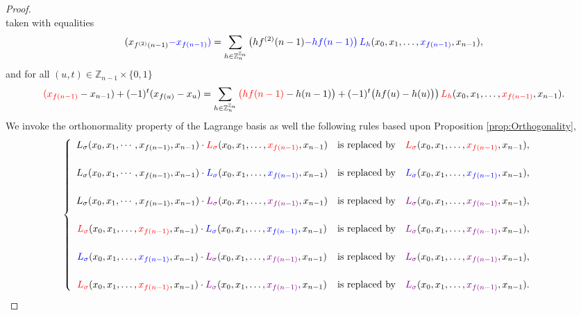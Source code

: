 \begin{proof}
\[\]
taken with equalities
\[
(x_{f^{(2)}(n-1)}{\color{blue}-x_{f(n-1)}}{\color{blue})}=\sum_{h\in\mathbb{Z}_{n}^{\mathbb{Z}_{n}}}\big(hf^{(2)}(n-1){\color{blue}-hf(n-1)}{\color{blue}\big)}\,{\color{blue}L_{h}}(x_{0},x_{1},\ldots,{\color{blue}x_{f(n-1)}},x_{n-1}),
\]
and for all $(u,t)\in\mathbb{Z}_{n-1}\times\{0,1\}$
\[
{\color{red}(x_{f(n-1)}}-x_{n-1})+(-1)^{t}(x_{f(u)}-x_{u})=\sum_{h\in\mathbb{Z}_{n}^{\mathbb{Z}_{n}}}{\color{red}\big(}{\color{red}hf(n-1)}-h(n-1)\big)+(-1)^{t}\big(hf(u)-h(u)\big)\big)\,{\color{red}L_{h}}(x_{0},x_{1},\ldots,{\color{red}x_{f(n-1)}},x_{n-1}).
\]
We invoke the orthonormality property of the Lagrange basis as well the following rules based upon Proposition \ref{prop:Orthogonality}, 
\[
\begin{cases}
\begin{array}{ccc}
L_{\sigma}(x_{0},x_{1},\cdots,x_{f(n-1)},x_{n-1})\cdot{\color{red}L_{\sigma}}(x_{0},x_{1},\ldots,{\color{red}x_{f(n-1)}},x_{n-1}) & \text{is replaced by} & {\color{red}L_{\sigma}}(x_{0},x_{1},\ldots,{\color{red}x_{f(n-1)}},x_{n-1}),\\
\\
L_{\sigma}(x_{0},x_{1},\cdots,x_{f(n-1)},x_{n-1})\cdot{\color{blue}L_{\sigma}}(x_{0},x_{1},\ldots,{\color{blue}x_{f(n-1)}},x_{n-1}) & \text{is replaced by} & {\color{blue}L_{\sigma}}(x_{0},x_{1},\ldots,{\color{blue}x_{f(n-1)}},x_{n-1}),\\
\\
L_{\sigma}(x_{0},x_{1},\cdots,x_{f(n-1)},x_{n-1})\cdot{\color{violet}L_{\sigma}}(x_{0},x_{1},\ldots,{\color{violet}x_{f(n-1)}},x_{n-1}) & \text{is replaced by} & {\color{violet}L_{\sigma}}(x_{0},x_{1},\ldots,{\color{violet}x_{f(n-1)}},x_{n-1}),\\
\\
{\color{red}L_{\sigma}}(x_{0},x_{1},\ldots,{\color{red}x_{f(n-1)}},x_{n-1})\cdot{\color{blue}L_{\sigma}}(x_{0},x_{1},\ldots,{\color{blue}x_{f(n-1)}},x_{n-1}) & \text{is replaced by} & {\color{violet}L_{\sigma}}(x_{0},x_{1},\ldots,{\color{violet}x_{f(n-1)}},x_{n-1}),\\
\\
{\color{blue}L_{\sigma}}(x_{0},x_{1},\ldots,{\color{blue}x_{f(n-1)}},x_{n-1})\cdot{\color{violet}L_{\sigma}}(x_{0},x_{1},\ldots,{\color{violet}x_{f(n-1)}},x_{n-1}) & \text{is replaced by} & {\color{violet}L_{\sigma}}(x_{0},x_{1},\ldots,{\color{violet}x_{f(n-1)}},x_{n-1}),\\
\\
{\color{red}L_{\sigma}}(x_{0},x_{1},\ldots,{\color{red}x_{f(n-1)}},x_{n-1})\cdot{\color{violet}L_{\sigma}}(x_{0},x_{1},\ldots,{\color{violet}x_{f(n-1)}},x_{n-1}) & \text{is replaced by} & {\color{violet}L_{\sigma}}(x_{0},x_{1},\ldots,{\color{violet}x_{f(n-1)}},x_{n-1}).\\

\end{array}
\end{cases}\]
\end{proof}
